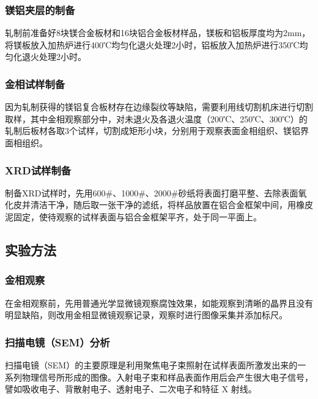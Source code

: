 \subsubsection{镁铝夹层的制备}
轧制前准备好8块镁合金板材和16块铝合金板材样品，镁板和铝板厚度均为2mm，将镁板放入加热炉进行400℃均匀化退火处理2小时，铝板放入加热炉进行350℃均匀化退火处理2小时。\par


\subsubsection{金相试样制备}
因为轧制获得的镁铝复合板材存在边缘裂纹等缺陷，需要利用线切割机床进行切割取样，其中金相观察部分中，对未退火及各退火温度（200℃、250℃、300℃）的轧制后板材各取3个试样，切割成矩形小块，分别用于观察表面金相组织、镁铝界面相组织。\par
\subsubsection{XRD试样制备}
制备XRD试样时，先用600$\#$、1000$\#$、2000$\#$砂纸将表面打磨平整、去除表面氧化皮并清洁干净，随后取一张干净的滤纸，将样品放置在铝合金框架中间，用橡皮泥固定，使待观察的试样表面与铝合金框架平齐，处于同一平面上。\par
\subsection{实验方法}
\subsubsection{金相观察}
在金相观察前，先用普通光学显微镜观察腐蚀效果，如能观察到清晰的晶界且没有明显缺陷，则改用金相显微镜观察记录，观察时进行图像采集并添加标尺。\par
\subsubsection{扫描电镜（SEM）分析}
扫描电镜（SEM）的主要原理是利用聚焦电子束照射在试样表面所激发出来的一系列物理信号所形成的图像。入射电子束和样品表面作用后会产生很大电子信号，譬如吸收电子、背散射电子、透射电子、二次电子和特征 X 射线。 \par

\clearpage